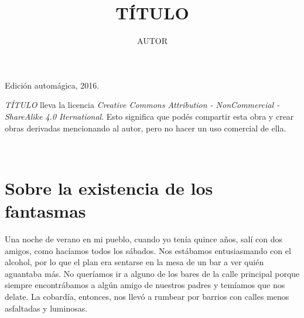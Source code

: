 \documentclass[11pt,twoside,openright]{book}
\title{TÍTULO}
\author{AUTOR}
\date{}
\begin{document}

\pagestyle{plain}


%
%

\maketitle

\cleardoublepage

\thispagestyle{empty}
\noindent
Edición automágica, 2016.\\

\vspace{0.5cm}

\noindent
\emph{TÍTULO} lleva la licencia
\emph{Creative Commons Attribution - NonCommercial - ShareAlike 4.0 Iternational}.
Esto significa que podés compartir esta obra y crear obras derivadas
mencionando al autor, pero no ha\-cer un uso comercial de ella.

\vfill

\noindent
\\

\cleardoublepage


\renewcommand*\contentsname{Índice}

\tableofcontents

\cleardoublepage







\chapter*{Sobre la existencia de los fantasmas} 





Una noche de verano en mi pueblo, cuando yo tenía quince años, salí con dos amigos, como hacíamos todos los sábados. Nos estábamos entusiasmando con el alcohol, por lo que el plan era sentarse en la mesa de un bar a ver quién aguantaba más. No queríamos ir a alguno de los bares de la calle principal porque siempre encontrábamos a algún amigo de nuestros padres y temíamos que nos delate. La cobardía, entonces, nos llevó a rumbear por barrios con calles menos asfaltadas y luminosas.
\end{document}
